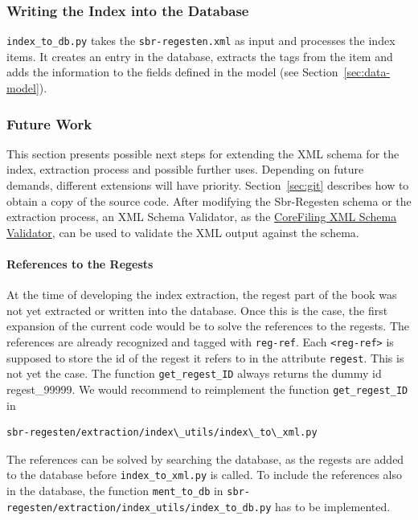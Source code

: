 \subsubsection{Writing the Index into the Database}
\texttt{index\_to\_db.py} takes the \texttt{sbr-regesten.xml} as input
and processes the index items. It creates an entry in the database,
extracts the tags from the item and adds the information to the fields
defined in the model (see Section~\ref{sec:data-model}).

\subsubsection{Future Work}
This section presents possible next steps for extending the XML schema
for the index, extraction process and possible further uses. Depending
on future demands, different extensions will have priority.
Section~\ref{sec:git} describes how to obtain a copy of the source
code. After modifying the Sbr-Regesten schema or the extraction
process, an XML Schema Validator, as the
\href{http://corefiling.com/opensource/schemaValidate.html}
{CoreFiling XML Schema Validator}, can be used to validate the XML
output against the schema.

\paragraph{References to the Regests}
At the time of developing the index extraction, the regest part of the
book was not yet extracted or written into the database. Once this is
the case, the first expansion of the current code would be to solve
the references to the regests. The references are already recognized
and tagged with \texttt{reg-ref}. Each \texttt{<reg-ref>} is supposed
to store the id of the regest it refers to in the attribute
\texttt{regest}. This is not yet the case. The function
\texttt{get\_regest\_ID} always returns the dummy id regest\_99999. We
would recommend to reimplement the function \texttt{get\_regest\_ID}
in

\begin{verbatim}
sbr-regesten/extraction/index\_utils/index\_to\_xml.py
\end{verbatim}

The references can be solved by searching the database, as the regests
are added to the database before \texttt{index\_to\_xml.py} is called.
To include the references also in the database, the function
\texttt{ment\_to\_db} in
\texttt{sbr-regesten/extraction/index\_utils/index\_to\_db.py} has to
be implemented.

